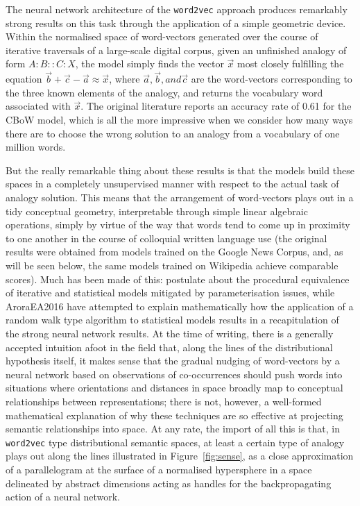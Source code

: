The neural network architecture of the \texttt{word2vec} approach produces remarkably strong results on this task through the application of a simple geometric device.  Within the normalised space of word-vectors generated over the course of iterative traversals of a large-scale digital corpus, given an unfinished analogy of form $A:B :: C:X$, the model simply finds the vector $\overrightarrow{x}$ most closely fulfilling the equation $\overrightarrow{b} + \overrightarrow{c} - \overrightarrow{a} \approx \overrightarrow{x}$, where $\overrightarrow{a}, \overrightarrow{b}, and \overrightarrow{c}$ are the word-vectors corresponding to the three known elements of the analogy, and returns the vocabulary word associated with $\overrightarrow{x}$.  The original literature reports an accuracy rate of 0.61 for the CBoW model, which is all the more impressive when we consider how many ways there are to choose the wrong solution to an analogy from a vocabulary of one million words.  \citep[It should be noted that similarly strong results have been reported for the hybrid frequentist-neural model of][.]{PenningtonEA2014}

But the really remarkable thing about these results is that the models build these spaces in a completely unsupervised manner with respect to the actual task of analogy solution.  This means that the arrangement of word-vectors plays out in a tidy conceptual geometry, interpretable through simple linear algebraic operations, simply by virtue of the way that words tend to come up in proximity to one another in the course of colloquial written language use (the original results were obtained from models trained on the Google News Corpus, and, as will be seen below, the same models trained on Wikipedia achieve comparable scores).  Much has been made of this: \cite{LevyEA2014} postulate about the procedural equivalence of iterative and statistical models mitigated by parameterisation issues, while AroraEA2016 have attempted to explain mathematically how the application of a random walk type algorithm to statistical models results in a recapitulation of the strong neural network results.  At the time of writing, there is a generally accepted intuition afoot in the field that, along the lines of the distributional hypothesis itself, it makes sense that the gradual nudging of word-vectors by a neural network based on observations of co-occurrences should push words into situations where orientations and distances in space broadly map to conceptual relationships between representations; there is not, however, a well-formed mathematical explanation of why these techniques are so effective at projecting semantic relationships into space.  At any rate, the import of all this is that, in \texttt{word2vec} type distributional semantic spaces, at least a certain type of analogy plays out along the lines illustrated in Figure~\ref{fig:sense}, as a close approximation of a parallelogram at the surface of a normalised hypersphere in a space delineated by abstract dimensions acting as handles for the backpropagating action of a neural network.


